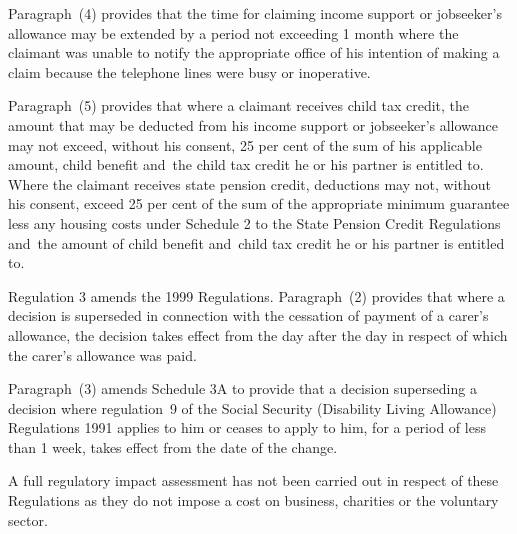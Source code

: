 \documentclass[12pt,a4paper]{article}
\begin{document}
Paragraph~(4) provides that the time for claiming income support or jobseeker’s allowance may be extended by a period not exceeding 1 month where the claimant was unable to notify the appropriate office of his intention of making a claim because the telephone lines were busy or inoperative.

Paragraph~(5) provides that where a claimant receives child tax credit, the amount that may be deducted from his income support or jobseeker’s allowance may not exceed, without his consent, 25 per cent of the sum of his applicable amount, child benefit and~the child tax credit he or his partner is entitled to. Where the claimant receives state pension credit, deductions may not, without his consent, exceed 25 per cent of the sum of the appropriate minimum guarantee less any housing costs under Schedule 2 to the State Pension Credit Regulations and~the amount of child benefit and~child tax credit he or his partner is entitled to.

Regulation 3 amends the 1999 Regulations. Paragraph~(2) provides that where a decision is superseded in connection with the cessation of payment of a carer’s allowance, the decision takes effect from the day after the day in respect of which the carer’s allowance was paid.

Paragraph~(3) amends Schedule 3A to provide that a decision superseding a decision where regulation~9 of the Social Security (Disability Living Allowance) Regulations 1991 applies to him or ceases to apply to him, for a period of less than 1 week, takes effect from the date of the change.

A full regulatory impact assessment has not been carried out in respect of these Regulations as they do not impose a cost on business, charities or the voluntary sector. 
\end{document}
